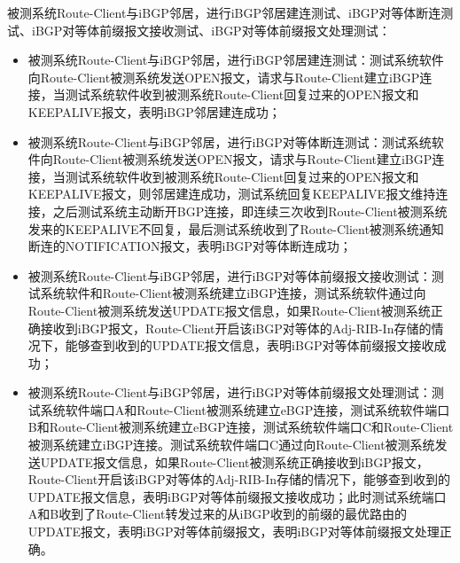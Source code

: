 被测系统Route-Client与iBGP邻居，进行iBGP邻居建连测试、iBGP对等体断连测试、iBGP对等体前缀报文接收测试、iBGP对等体前缀报文处理测试：
\begin{itemize}
  \item 被测系统Route-Client与iBGP邻居，进行iBGP邻居建连测试：测试系统软件向Route-Client被测系统发送OPEN报文，请求与Route-Client建立iBGP连接，当测试系统软件收到被测系统Route-Client回复过来的OPEN报文和KEEPALIVE报文，表明iBGP邻居建连成功；
  \item 被测系统Route-Client与iBGP邻居，进行iBGP对等体断连测试：测试系统软件向Route-Client被测系统发送OPEN报文，请求与Route-Client建立iBGP连接，当测试系统软件收到被测系统Route-Client回复过来的OPEN报文和KEEPALIVE报文，则邻居建连成功，测试系统回复KEEPALIVE报文维持连接，之后测试系统主动断开BGP连接，即连续三次收到Route-Client被测系统发来的KEEPALIVE不回复，最后测试系统收到了Route-Client被测系统通知断连的NOTIFICATION报文，表明iBGP对等体断连成功；
  \item 被测系统Route-Client与iBGP邻居，进行iBGP对等体前缀报文接收测试：测试系统软件和Route-Client被测系统建立iBGP连接，测试系统软件通过向Route-Client被测系统发送UPDATE报文信息，如果Route-Client被测系统正确接收到iBGP报文，Route-Client开启该iBGP对等体的Adj-RIB-In存储的情况下，能够查到收到的UPDATE报文信息，表明iBGP对等体前缀报文接收成功；
  \item 被测系统Route-Client与iBGP邻居，进行iBGP对等体前缀报文处理测试：测试系统软件端口A和Route-Client被测系统建立eBGP连接，测试系统软件端口B和Route-Client被测系统建立eBGP连接，测试系统软件端口C和Route-Client被测系统建立iBGP连接。测试系统软件端口C通过向Route-Client被测系统发送UPDATE报文信息，如果Route-Client被测系统正确接收到iBGP报文，Route-Client开启该iBGP对等体的Adj-RIB-In存储的情况下，能够查到收到的UPDATE报文信息，表明iBGP对等体前缀报文接收成功；此时测试系统端口A和B收到了Route-Client转发过来的从iBGP收到的前缀的最优路由的UPDATE报文，表明iBGP对等体前缀报文，表明iBGP对等体前缀报文处理正确。\\
\end{itemize}





